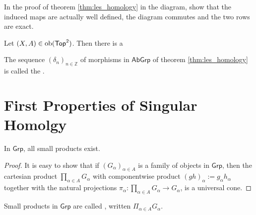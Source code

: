 \begin{exercise}
	In the proof of theorem \ref{thm:les_homology} in the diagram, show that the induced maps are actually well defined, the diagram commutes and the two rows are exact.
\end{exercise}

\begin{corollary}
	Let $(X,A) \in \operatorname{ob}(\mathsf{Top}^2)$. Then there is a 
\end{corollary}

\begin{definition}
	The sequence $(\delta_n)_{n \in \mathbb{Z}}$ of morphisms in $\mathsf{AbGrp}$ of theorem \ref{thm:les_homology} is called the .
\end{definition}

\begin{theorem}
		
\end{theorem}

\section*{First Properties of Singular Homolgy}

\begin{proposition}
	In $\mathsf{Grp}$, all small products exist.
\end{proposition}

\begin{proof}
	It is easy to show that if $(G_\alpha)_{\alpha \in A}$ is a family of objects in $\mathsf{Grp}$, then the cartesian product $\prod_{\alpha \in A}G_\alpha$ with componentwise product $(gh)_\alpha := g_\alpha h_\alpha$ together with the natural projections $\pi_\alpha : \prod_{\alpha \in A} G_\alpha \to G_\alpha$, is a universal cone.
\end{proof}

\begin{definition}
	Small products in $\mathsf{Grp}$ are called , written $\Pi_{\alpha \in A} G_\alpha$.
\end{definition}

